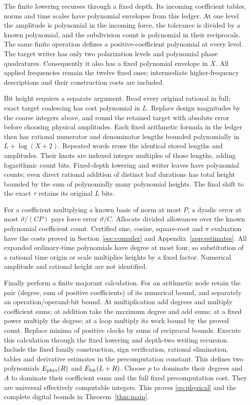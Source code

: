 \documentclass[11pt,a4paper]{amsart}
\theoremstyle{definition}
\theoremstyle{remark}
\numberwithin{equation}{section}
\begin{document}
The finite lowering recurses through a fixed depth. Its incoming coefficient tables, norms and time scales have polynomial envelopes from this ledger. At one level the amplitude is polynomial in the incoming force, the tolerance is divided by a known polynomial, and the subdivision count is polynomial in their reciprocals. The same finite operation defines a positive-coefficient polynomial at every level. The target writer has only two polarization levels and polynomial phase quadratures. Consequently it also has a fixed polynomial envelope in $X$. All applied frequencies remain the twelve fixed ones; intermediate higher-frequency descriptions and their construction costs are included.

Bit height requires a separate argument. Read every original rational in full; exact target coalescing has cost polynomial in $L$. Replace design magnitudes by the coarse integers above, and round the retained target with absolute error before choosing physical amplitudes. Each fixed arithmetic formula in the ledger then has rational numerator and denominator lengths bounded polynomially in $L+\log(X+2)$. Repeated words reuse the identical stored lengths and amplitudes. Their knots are indexed integer multiples of those lengths, adding logarithmic count bits. Fixed-depth lowering and writer leaves have polynomial counts; even direct rational addition of distinct leaf durations has total height bounded by the sum of polynomially many polynomial heights. The final shift to the exact $\tau$ retains its original $L$ bits.

For a coefficient multiplying a known basis of norm at most $P$, a dyadic error at most $\vartheta/(CP)$ pays force error $\vartheta/C$. Allocate divided allowances over the known polynomial coefficient count. Certified sine, cosine, square-root and $\pi$ evaluation have the costs proved in Section~\ref{sec:compiler} and Appendix~\ref{app:estimates}. All expanded ordinary-time polynomials have degree at most four, so substitution of a rational time origin or scale multiplies heights by a fixed factor. Numerical amplitude and rational height are not identified.

Finally perform a finite majorant calculation. For an arithmetic node retain the pair (degree, sum of positive coefficients) of its numerical bound, and separately an operation/operand-bit bound. At multiplication add degrees and multiply coefficient sums; at addition take the maximum degree and add sums; at a fixed power multiply the degree; at a loop multiply its work bound by the proved count. Replace minima of positive clocks by sums of reciprocal bounds. Execute this calculation through the fixed lowering and depth-two writing recursion. Include the fixed family construction, sign verification, rational elimination, tables and derivative estimates in the precomputation constant. This defines two polynomials $E_{\rm phys}(R)$ and $E_{\rm bit}(L+R)$. Choose $p$ to dominate their degrees and $A$ to dominate their coefficient sums and the full fixed precomputation cost. They are universal effectively computable integers. This proves \eqref{eq:physical} and the complete digital bounds in Theorem~\ref{thm:main}.
\end{document}
